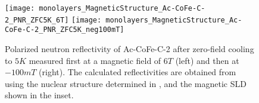 \documentclass[\main/dresen_thesis.tex]{subfiles}
\begin{document}
\begin{figure}[tb]
  \centering
  \texttt{[image: monolayers\_MagneticStructure\_Ac-CoFe-C-2\_PNR\_ZFC5K\_6T]}
  \texttt{[image: monolayers\_MagneticStructure\_Ac-CoFe-C-2\_PNR\_ZFC5K\_neg100mT]}
  \caption{\label{fig:monolayer:magneticStructure:pnr5K}Polarized neutron reflectivity of Ac-CoFe-C-2 after zero-field cooling to $5 \unit{K}$ measured first at a magnetic field of $6 \unit{T}$ (left) and then at $-100 \unit{mT}$ (right). The calculated reflectivities are obtained from using the nuclear structure determined in , and the magnetic SLD shown in the inset.}
\end{figure}
\end{document}
